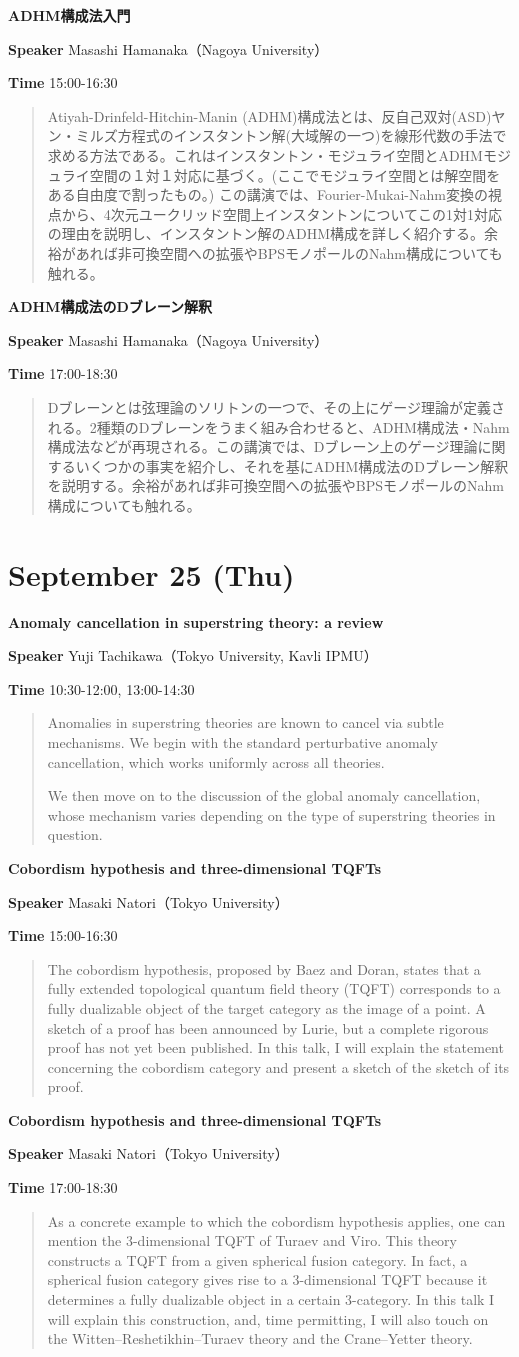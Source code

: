 \documentclass{ltjsarticle}
\theoremstyle{mystyle} %
\numberwithin{equation}{section}
\newcommand{\spkB}{Masashi Hamanaka}
\newcommand{\spkC}{Yuji Tachikawa}
\newcommand{\spkD}{Masaki Natori}
\newcommand{\instB}{Nagoya University}
\newcommand{\instC}{Tokyo University, Kavli IPMU}
\newcommand{\instD}{Tokyo University}
\newcommand{\titleB}{ADHM構成法入門}
\newcommand{\titleBB}{ADHM構成法のDブレーン解釈}
\newcommand{\titleC}{Anomaly cancellation in superstring theory: a review}
\newcommand{\titleD}{Cobordism hypothesis and three-dimensional TQFTs}
\newcommand{\abst}[5]{
    \Large
    \textbf{#1}
    \normalsize
    
    \vspace{10pt}

    \textbf{Speaker} #2（#3）

    \textbf{Time} #4

    \vspace{5pt}

    \begin{quote}
        #5
    \end{quote}

    \vspace{10pt}
}
\begin{document}
\vspace{30pt}

\abst{\titleB}{\spkB}{\instB}{15:00-16:30}{
    Atiyah-Drinfeld-Hitchin-Manin (ADHM)構成法とは、反自己双対(ASD)ヤン・ミルズ方程式のインスタントン解(大域解の一つ)を線形代数の手法で求める方法である。これはインスタントン・モジュライ空間とADHMモジュライ空間の１対１対応に基づく。(ここでモジュライ空間とは解空間をある自由度で割ったもの。) この講演では、Fourier-Mukai-Nahm変換の視点から、4次元ユークリッド空間上インスタントンについてこの1対1対応の理由を説明し、インスタントン解のADHM構成を詳しく紹介する。余裕があれば非可換空間への拡張やBPSモノポールのNahm構成についても触れる。
}

\abst{\titleBB}{\spkB}{\instB}{17:00-18:30}{
    Dブレーンとは弦理論のソリトンの一つで、その上にゲージ理論が定義される。2種類のDブレーンをうまく組み合わせると、ADHM構成法・Nahm構成法などが再現される。この講演では、Dブレーン上のゲージ理論に関するいくつかの事実を紹介し、それを基にADHM構成法のDブレーン解釈を説明する。余裕があれば非可換空間への拡張やBPSモノポールのNahm構成についても触れる。
}

\newpage

\section*{September 25 (Thu)}

\abst{\titleC}{\spkC}{\instC}{10:30-12:00, 13:00-14:30}{
    Anomalies in superstring theories are known to cancel via subtle mechanisms. We begin with the standard perturbative anomaly cancellation, which works uniformly across all theories. \\\relax
    
    We then move on to the discussion of the global anomaly cancellation, whose mechanism varies depending on the type of superstring theories in question.
}

\abst{\titleD}{\spkD}{\instD}{15:00-16:30}{
    The cobordism hypothesis, proposed by Baez and Doran, states that a fully extended topological quantum field theory (TQFT) corresponds to a fully dualizable object of the target category as the image of a point. A sketch of a proof has been announced by Lurie, but a complete rigorous proof has not yet been published. In this talk, I will explain the statement concerning the cobordism category and present a sketch of the sketch of its proof.
}

\abst{\titleD}{\spkD}{\instD}{17:00-18:30}{
    As a concrete example to which the cobordism hypothesis applies, one can mention the 3-dimensional TQFT of Turaev and Viro. This theory constructs a TQFT from a given spherical fusion category. In fact, a spherical fusion category gives rise to a 3-dimensional TQFT because it determines a fully dualizable object in a certain 3-category. In this talk I will explain this construction, and, time permitting, I will also touch on the Witten–Reshetikhin–Turaev theory and the Crane–Yetter theory.
}
\end{document}
